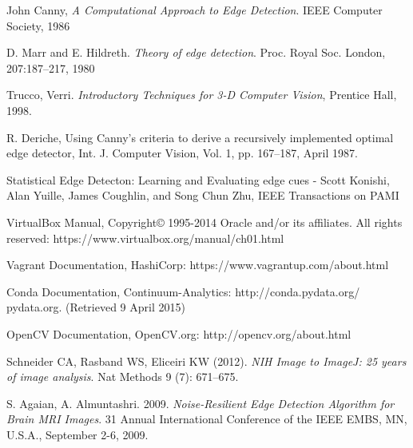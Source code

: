 \documentclass[a4paper,12pt]{article}
\begin{document}
\begin{thebibliography}{9}
John Canny, {\em A Computational Approach to Edge Detection}. IEEE Computer Society, 1986

D. Marr and E. Hildreth. {\em Theory of edge detection}. Proc. Royal Soc. London, 207:187–217, 1980

Trucco, Verri. {\em Introductory Techniques for 3-D Computer Vision}, Prentice Hall, 1998.

R. Deriche, Using Canny's criteria to derive a recursively implemented optimal edge detector, Int. J. Computer Vision, Vol. 1, pp. 167–187, April 1987.

Statistical Edge Detecton: Learning and Evaluating edge cues - Scott Konishi, Alan Yuille, James Coughlin, and Song Chun Zhu, IEEE Transactions on PAMI

VirtualBox Manual, Copyright© 1995-2014 Oracle and/or its affiliates. All rights reserved: https://www.virtualbox.org/manual/ch01.html

Vagrant Documentation, HashiCorp: https://www.vagrantup.com/about.html

Conda Documentation, Continuum-Analytics: http://conda.pydata.org/ pydata.org. (Retrieved 9 April 2015)

OpenCV Documentation, OpenCV.org: http://opencv.org/about.html

Schneider CA, Rasband WS, Eliceiri KW (2012). {\em NIH Image to ImageJ: 25 years of image analysis}. Nat Methods 9 (7): 671–675.

S. Agaian, A. Almuntashri. 2009. {\em Noise-Resilient Edge Detection Algorithm for Brain MRI Images}. 31 Annual International Conference of the IEEE EMBS, MN, U.S.A., September 2-6, 2009.




\end{thebibliography}
\end{document}
